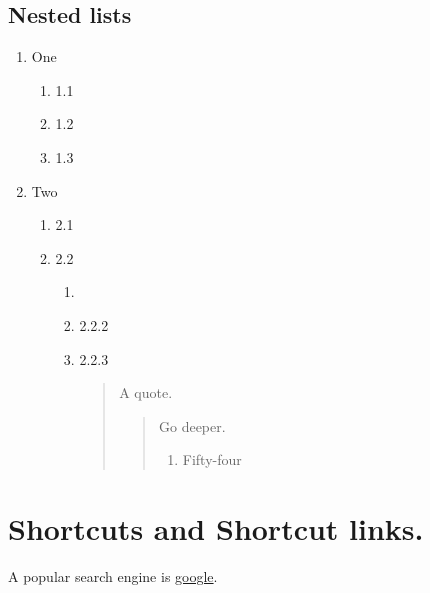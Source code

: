 \subsection{\label{nested-lists}Nested lists}
\begin{enumerate}
\item
\par One
\begin{enumerate}
\item
\par 1.1 \item
\par 1.2 \item
\par 1.3
\end{enumerate}
\par \item
\par Two
\begin{enumerate}
\item
\par 2.1 \item
\par 2.2
\begin{enumerate}
\item
\par {} \item
\par 2.2.2 \item
\par 2.2.3
\begin{quote}
\par A quote.
\begin{quote}
\par Go deeper.
\begin{enumerate}
\item
\par Fifty-four
\end{enumerate}
\end{quote}
\end{quote}
\end{enumerate}
\end{enumerate}
\end{enumerate}
\section{\label{shortcuts-and-shortcut-links.}Shortcuts and Shortcut links.}
\par A popular search engine is \href{www.google.com}{google}.
